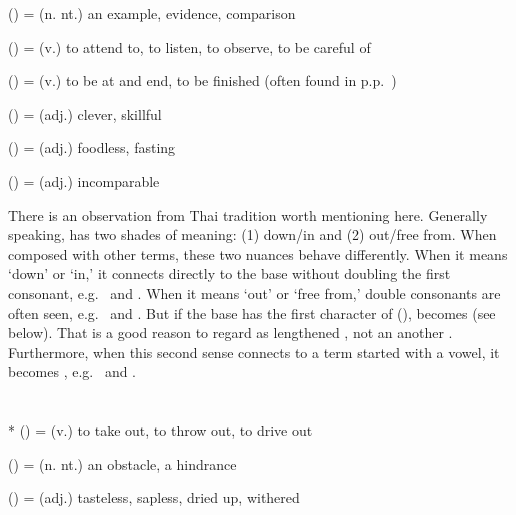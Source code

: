 \begin{compactitem}
\item {} () = (n. nt.) an example, evidence, comparison
\item {} () = (v.) to attend to, to listen, to observe, to be careful of
\item {} () = (v.) to be at and end, to be finished (often found in p.p.\ )
\item {} () = (adj.) clever, skillful
\item {} () = (adj.) foodless, fasting
\item {} () = (adj.) incomparable
\end{compactitem}
There is an observation from Thai tradition worth mentioning here. Generally speaking,  has two shades of meaning: (1) down/in and (2) out/free from. When composed with other terms, these two nuances behave differently. When it means `down' or `in,' it connects directly to the base without doubling the first consonant, e.g.\  and . When it means `out' or `free from,' double consonants are often seen, e.g.\  and . But if the base has the first character of  (),  becomes  (see below). That is a good reason to regard  as lengthened , not an another . Furthermore, when this second sense connects to a term started with a vowel, it becomes , e.g.\  and .

\section*{}\label{upasagga:nii}
\begin{compactitem}
\item {}* () = (v.) to take out, to throw out, to drive out
\item {} () = (n. nt.) an obstacle, a hindrance
\item {} () = (adj.) tasteless, sapless, dried up, withered
\end{compactitem}

